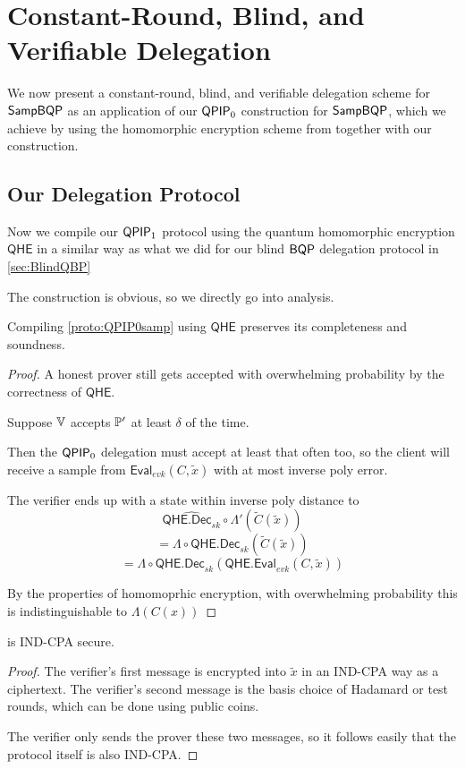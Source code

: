\section{Constant-Round, Blind, and Verifiable Delegation}

We now present a constant-round, blind, and verifiable delegation scheme for $\operatorname{\mathsf{SampBQP}}$ as an application of our $\operatorname{\mathsf{QPIP}}_0$ construction for $\operatorname{\mathsf{SampBQP}}$,
which we achieve by using the homomorphic encryption scheme from \cite{mahadev_qfhe} together with our construction.

\subsection{Our Delegation Protocol}

Now we compile our $\operatorname{\mathsf{QPIP}}_1$ protocol  using the quantum homomorphic encryption $\mathsf{QHE}$  in a similar way as what we did for our blind $\operatorname{\mathsf{BQP}}$ delegation protocol in \cref{sec:BlindQBP}

The construction is obvious,  so we directly go into analysis.

\begin{thm}
	Compiling \cref{proto:QPIP0samp} using $\mathsf{QHE}$ preserves its completeness and soundness.
\end{thm}
\begin{proof}
	A honest prover still gets accepted with overwhelming probability by the correctness of $\mathsf{QHE}$. 

	Suppose $\mathbb{V}$ accepts $\mathbb{P}'$ at least $\delta$ of the time.

	Then the $\operatorname{\mathsf{QPIP}}_0$ delegation must accept at least that often too,
	so the client will receive a sample from $\mathsf{Eval}_{evk}(C, \tilde{x})$ with at most inverse poly error. 

	The verifier ends up with a state within inverse poly distance to
		$$\widehat{\mathsf{QHE.Dec}_{sk}}\circ\Lambda'(\tilde{C}(\tilde{x}))$$
		$$=\Lambda\circ\mathsf{QHE.Dec}_{sk}(\tilde{C}(\tilde{x}))$$
		$$=\Lambda\circ\mathsf{QHE.Dec}_{sk}(\mathsf{QHE.Eval}_{evk}(C, \tilde{x}))$$

	By the properties of homomoprhic encryption, with overwhelming probability this is indistinguishable to  $\Lambda(C(x))$
\end{proof}

\begin{thm}
	 is IND-CPA secure.
\end{thm}
\begin{proof}
	The verifier's first message is encrypted into $\tilde{x}$ in an IND-CPA way as a ciphertext.
	The verifier's second message is the basis choice of Hadamard or test rounds, which can be done using public coins.

	The verifier only sends the prover these two messages, so it follows  easily that the protocol itself is also IND-CPA. 
\end{proof}
